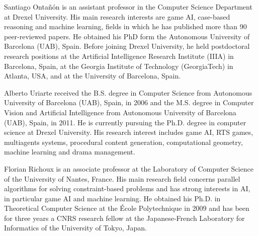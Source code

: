 \documentclass[journal]{IEEEtran}
\begin{document}
\begin{IEEEbiographynophoto}{Santiago Onta\~{n}\'{o}n}
is an assistant professor in the Computer Science Department at Drexel University. His main research interests are game AI, case-based reasoning and machine learning, fields in which he has published more than 90 peer-reviewed papers. He obtained his PhD form the Autonomous University of Barcelona (UAB), Spain. Before joining Drexel University, he held postdoctoral research positions at the Artificial Intelligence Research Institute (IIIA) in Barcelona, Spain, at the Georgia Institute of Technology (GeorgiaTech) in Atlanta, USA, and at the University of Barcelona, Spain.  
\end{IEEEbiographynophoto}

\begin{IEEEbiographynophoto}{Alberto Uriarte}
received the B.S. degree in Computer Science from Autonomous University of Barcelona (UAB), Spain, in 2006 and the M.S. degree in Computer Vision and Artificial Intelligence from Autonomous University of Barcelona (UAB), Spain, in 2011. He is currently pursuing the Ph.D. degree in computer science at Drexel University. His research interest includes game AI, RTS games, multiagents systems, procedural content generation, computational geometry, machine learning and drama management.  
\end{IEEEbiographynophoto}

\begin{IEEEbiographynophoto}{Florian Richoux}
  is an associate  professor at the Laboratory of  Computer Science of
  the University of Nantes,  France.  His main research field concerns
  parallel  algorithms for solving  constraint-based problems  and has
  strong  interests   in  AI,  in  particular  game   AI  and  machine
  learning. He  obtained his Ph.D. in Theoretical  Computer Science at
  the {\'E}cole Polytechnique  in 2009 and has been  for three years a
  CNRS   research  fellow  at   the  Japanese-French   Laboratory  for
  Informatics of the University of Tokyo, Japan.
\end{IEEEbiographynophoto}
\end{document}
